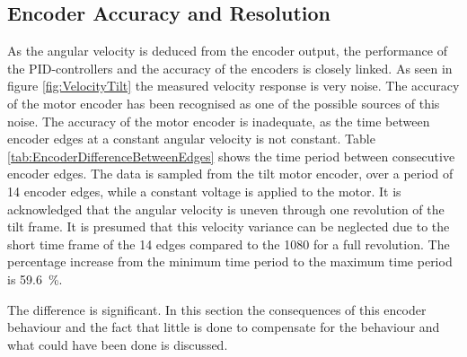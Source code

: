 \documentclass[../../main.tex]{subfiles}
\begin{document}



\subsection{Encoder Accuracy and Resolution}
As the angular velocity is deduced from the encoder output, the performance of the PID-controllers and the accuracy of the encoders is closely linked. As seen in figure \ref{fig:VelocityTilt} the measured velocity response is very noise. The accuracy of the motor encoder has been recognised as one of the possible sources of this noise. 
The accuracy of the motor encoder is inadequate, as the time between encoder edges at a constant angular velocity is not constant. Table \ref{tab:EncoderDifferenceBetweenEdges} shows the time period between consecutive encoder edges. The data is sampled from the tilt motor encoder, over a period of 14 encoder edges, while a constant voltage is applied to the motor. It is acknowledged that the angular velocity is uneven through one revolution of the tilt frame. It is presumed that this velocity variance can be neglected due to the short time frame of the 14 edges compared to the 1080 for a full revolution. 
The percentage increase from the minimum time period to the maximum time period is \SI{59.6}{\percent}.

The difference is significant. In this section the consequences of this encoder behaviour and the fact that little is done to compensate for the behaviour and what could have been done is discussed.
\end{document}
